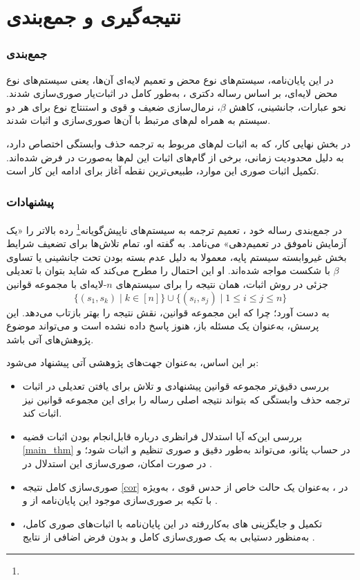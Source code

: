 \chapter{نتیجه‌گیری و جمع‌بندی}\label{S5}
\pagestyle{plain}
\setcounter{footnote}{0}
\subsection*{جمع‌بندی}

در این پایان‌نامه، سیستم‌های نوع محض و تعمیم لایه‌ای آن‌ها، یعنی سیستم‌های نوع محض لایه‌ای، بر اساس رساله دکتری
 \cite{mull2023}،
به‌طور کامل در اثبات‌یار
صوری‌سازی شدند. نحو عبارات، جانشینی، کاهش
$\beta$،
نرمال‌سازی ضعیف و قوی و استنتاج نوع برای هر دو سیستم به همراه لم‌های مرتبط با آن‌ها صوری‌سازی و اثبات شدند.

در بخش نهایی کار، که به اثبات لم‌های مربوط به ترجمه حذف‌ وابستگی اختصاص دارد، به دلیل محدودیت زمانی، برخی از گام‌های اثبات این لم‌ها به‌صورت
در
فرض شده‌اند. تکمیل اثبات صوری این موارد، طبیعی‌ترین نقطه آغاز برای ادامه این کار است.

\subsection*{پیشنهادات}

در جمع‌بندی رساله خود
\cite{mull2023}،
تعمیم ترجمه
 \cite{geuvers1991}
به سیستم‌های ناپیش‌گویانه\footnote{} رده بالاتر را «یک آزمایش ناموفق در تعمیم‌دهی» می‌نامد.
به گفته او، تمام تلاش‌ها برای تضعیف شرایط بخش غیروابسته سیستم پایه، معمولا به دلیل عدم بسته بودن تحت جانشینی یا تساوی
$\beta$
با شکست مواجه شده‌اند. او این احتمال را مطرح می‌کند که شاید بتوان با تعدیلی جزئی در روش اثبات، همان نتیجه را برای سیستم‌های
$n$-لایه‌ای
با مجموعه قوانین
\[
\{(s_1, s_k) \mid k \in [n]\} \cup \{(s_i, s_j) \mid 1 \le i \le j \le n\}
\]
به دست آورد؛ چرا که این مجموعه قوانین، نقش نتیجه 
را بهتر بازتاب می‌دهد. این پرسش، به‌عنوان یک مسئله باز، هنوز
پاسخ داده نشده است و می‌تواند موضوع پژوهش‌های آتی باشد.

بر این اساس، به‌عنوان جهت‌های پژوهشی آتی پیشنهاد می‌شود:

\begin{itemize}
  \item بررسی دقیق‌تر مجموعه قوانین پیشنهادی 
    و تلاش برای یافتن تعدیلی در اثبات ترجمه حذف‌ وابستگی که
    بتواند نتیجه اصلی رساله را برای این مجموعه قوانین نیز اثبات کند.
  \item بررسی این‌که آیا استدلال فرانظری  درباره قابل‌انجام
    بودن اثبات قضیه \ref{main_thm} در حساب پئانو، می‌تواند به‌طور دقیق و صوری تنظیم
    و اثبات شود؛ و در صورت امکان، صوری‌سازی این استدلال در .
  \item صوری‌سازی کامل نتیجه \ref{cor}
    در ، به‌عنوان یک حالت خاص از حدس قوی
    ، به‌ویژه با تکیه بر صوری‌سازی موجود
    این پایان‌نامه از  و .
  \item تکمیل و جایگزینی  های به‌کاررفته در این پایان‌نامه
    با اثبات‌های صوری کامل، به‌منظور دستیابی به یک
    صوری‌سازی کامل و بدون فرض اضافی از نتایج .
\end{itemize}